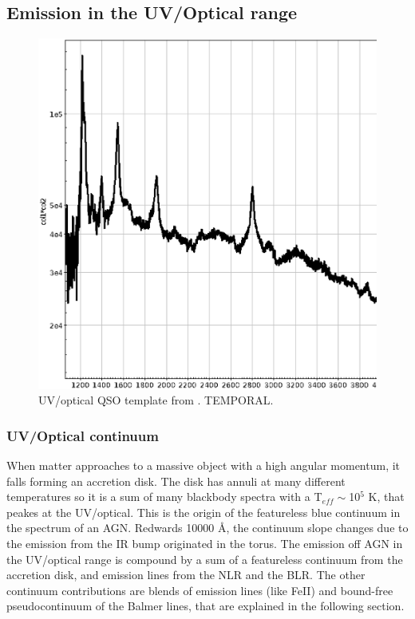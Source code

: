 \subsection{Emission in the UV/Optical range}
\label{sec1:opem}


 \begin{figure}
 \centering
 \includegraphics[width=\textwidth]{Chapter1_intro/test_shen_agn.ps}
    \caption{UV/optical QSO template from \cite{shen16}. TEMPORAL.}
 \label{sec1:fig_oe}
 \end{figure}


\subsubsection{UV/Optical continuum}
\label{sec1:coem}

When matter approaches to a massive object with a high angular momentum, it falls forming an accretion disk. The disk has annuli at many different temperatures so it is a sum of many blackbody spectra with a T$_{eff}\sim$10$^5$ K, that peakes at the UV/optical. This is the origin of the featureless blue continuum in the spectrum of an AGN. Redwards 10000 \AA, the continuum slope changes due to the emission from the IR bump originated in the torus. The emission off AGN in the UV/optical range is compound by a sum of a featureless continuum from the accretion disk, and emission lines from the NLR and the BLR. The other continuum contributions are blends of emission lines (like FeII) and bound-free pseudocontinuum of the Balmer lines, that are explained in the following section.

